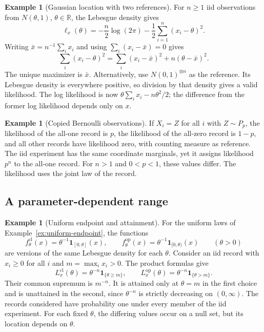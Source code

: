 \documentclass[11pt,oneside]{book}
\theoremstyle{definition}
\newtheorem{example}[theorem]{Example}
\theoremstyle{remark}
\newcommand{\R}{\mathbb R}
\begin{document}
\begin{example}[Gaussian location with two references]
\label{ex:gaussian-likelihood}
For $n\geq1$ iid observations from $N(\theta,1)$, $\theta\in\R$,
the Lebesgue density gives
\[
\ell_x(\theta)=-\frac n2\log(2\pi)-\frac12\sum_{i=1}^n(x_i-\theta)^2.
\]
Writing $\bar x=n^{-1}\sum_i x_i$ and using $\sum_i(x_i-\bar x)=0$ gives
\[
\sum_i(x_i-\theta)^2=\sum_i(x_i-\bar x)^2+n(\theta-\bar x)^2.
\]
The unique maximizer is $\bar x$. Alternatively, use $N(0,1)^{\otimes n}$
as the reference. Its Lebesgue density is everywhere positive, so division
by that density gives a valid likelihood. The log likelihood is now
$\theta\sum_i x_i-n\theta^2/2$; the difference from the former log likelihood
depends only on $x$.
\end{example}

\begin{example}[Copied Bernoulli observations]
\label{ex:copied-likelihood}
If $X_i=Z$ for all $i$ with $Z\sim P_p$, the likelihood of the all-one
record is $p$, the likelihood of the all-zero record is $1-p$, and all
other records have likelihood zero, with counting measure as reference.
The iid experiment has the same coordinate marginals, yet it assigns
likelihood $p^n$ to the all-one record. For $n>1$ and $0<p<1$, these values
differ. The likelihood uses the joint law of the record.
\end{example}

\subsection{A parameter-dependent range}
\label{subsec:endpoint-likelihood}

\begin{example}[Uniform endpoint and attainment]
\label{ex:uniform-likelihood-versions}
For the uniform laws of Example~\ref{ex:uniform-endpoint}, the functions
\[
f_\theta^{\mathrm{cl}}(x)=\theta^{-1}\mathbf 1_{[0,\theta]}(x),
\qquad
f_\theta^{\mathrm{op}}(x)=\theta^{-1}\mathbf 1_{[0,\theta)}(x)
\qquad(\theta>0)
\]
are versions of the same Lebesgue density for each $\theta$. Consider an
iid record with $x_i\geq0$ for all $i$ and $m=\max_i x_i>0$.
The product formulas give
\[
L_x^{\mathrm{cl}}(\theta)=\theta^{-n}\mathbf 1_{\{\theta\geq m\}},
\qquad
L_x^{\mathrm{op}}(\theta)=\theta^{-n}\mathbf 1_{\{\theta>m\}}.
\]
Their common supremum is $m^{-n}$. It is attained only at $\theta=m$ in
the first choice and is unattained in the second, since $\theta^{-n}$ is
strictly decreasing on $(0,\infty)$. The records considered have
probability one under every member of the iid experiment. For each fixed
$\theta$, the differing values occur on a null set, but its location
depends on $\theta$.
\end{example}
\end{document}
